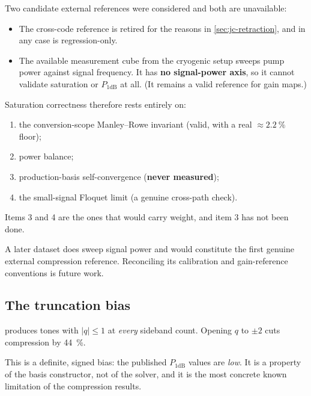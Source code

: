 \begin{caveat}
Two candidate external references were considered and both are unavailable:
\begin{itemize}
\item The cross-code reference is retired for the reasons in
      \cref{sec:jc-retraction}, and in any case is regression-only.
\item The available measurement cube from the cryogenic setup sweeps pump power
      against signal frequency. It has \textbf{no signal-power axis}, so it
      cannot validate saturation or $P_{1\mathrm{dB}}$ at all. (It remains a
      valid reference for gain maps.)
\end{itemize}

Saturation correctness therefore rests entirely on:
\begin{enumerate}
\item the conversion-scope Manley--Rowe invariant (valid, with a real
      $\approx\SI{2.2}{\percent}$ floor);
\item power balance;
\item production-basis self-convergence (\textbf{never measured});
\item the small-signal Floquet limit (a genuine cross-path check).
\end{enumerate}
Items 3 and 4 are the ones that would carry weight, and item 3 has not been done.
\end{caveat}

A later dataset does sweep signal power and would constitute the first genuine
external compression reference. Reconciling its calibration and gain-reference
conventions is future work.

\subsection{The truncation bias}

\begin{measured}
 produces tones with $|q|\le1$ at
\emph{every} sideband count. Opening $q$ to $\pm2$ cuts compression by
\SI{44}{\percent}.
\end{measured}

This is a definite, signed bias: the published $P_{1\mathrm{dB}}$ values are
\emph{low}. It is a property of the basis constructor, not of the solver, and it
is the most concrete known limitation of the compression results.

